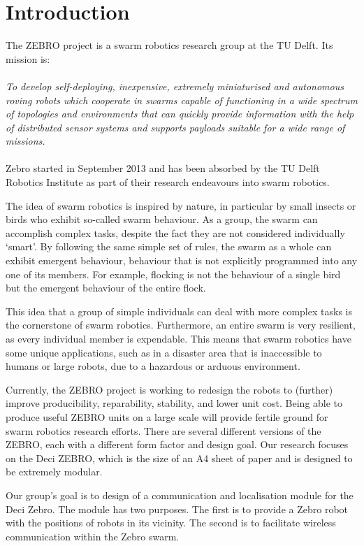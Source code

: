 \chapter{Introduction}

The ZEBRO project is a swarm robotics research group at the TU Delft.
Its mission is:
\\\\
\emph{To develop self-deploying, inexpensive, extremely miniaturised and autonomous roving robots which cooperate in swarms capable of functioning in a wide spectrum of topologies and environments that can quickly provide information with the help of distributed sensor systems and supports payloads suitable for a wide range of missions.}
\\\\
Zebro started in September 2013 and has been absorbed by the TU Delft Robotics Institute as part of their research endeavours into swarm robotics.

The idea of swarm robotics is inspired by nature, in particular by small insects or birds who exhibit so-called swarm behaviour.
As a group, the swarm can accomplish complex tasks, despite the fact they are not considered individually `smart'.
By following the same simple set of rules, the swarm as a whole can exhibit emergent behaviour, behaviour that is not explicitly programmed into any one of its members.
For example, flocking is not the behaviour of a single bird but the emergent behaviour of the entire flock.

This idea that a group of simple individuals can deal with more complex tasks is the cornerstone of swarm robotics.
Furthermore, an entire swarm is very resilient, as every individual member is expendable.
This means that swarm robotics have some unique applications, such as in a disaster area that is inaccessible to humans or large robots, due to a hazardous or arduous environment.

Currently, the ZEBRO project is working to redesign the robots to (further) improve producibility, reparability, stability, and lower unit cost.
Being able to produce useful ZEBRO units on a large scale will provide fertile ground for swarm robotics research efforts.
There are several different versions of the ZEBRO, each with a different form factor and design goal.
Our research focuses on the Deci ZEBRO, which is the size of an A4 sheet of paper and is designed to be extremely modular.

Our group's goal is to design of a communication and localisation module for the Deci Zebro.
The module has two purposes.
The first is to provide a Zebro robot with the positions of robots in its vicinity.
The second is to facilitate wireless communication within the Zebro swarm.

